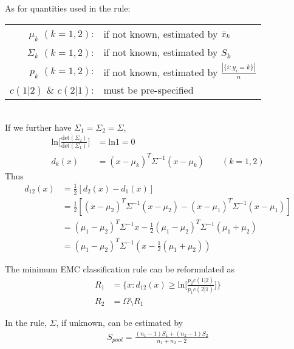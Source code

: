 \documentclass[12pt]{extarticle}
\newcommand{\<}{\langle}
\renewcommand{\>}{\rangle}
\theoremstyle{definition}
\begin{document}
As for quantities used in the rule:\\
\begin{tabular}{rl}
$\mu_k$ $(k=1,2)$:& if not known, estimated by $\Bar{x}_k$\\
$\Sigma_k$ $(k=1,2)$:& if not known, estimated by $S_k$\\
$p_k$ $(k=1,2)$:& if not known, estimated by $\frac{|\{i:y_i =k\}|}{n}$\\
$c(1|2)$ \& $c(2|1)$:& must be pre-specified
\end{tabular}\\

\newpage
If we further have $\Sigma_1 =\Sigma_2 =\Sigma$,
\begin{align*}
    \text{ln}\bigg[\frac{\text{det}(\Sigma_2)}{\text{det}(\Sigma_1)}\bigg] &= \text{ln}1 = 0\\
    d_k(x) &= (x-\mu_k)^T \Sigma^{-1} (x-\mu_k) \qquad (k=1,2)
\end{align*}
Thus
\begin{align*}
    d_{12}(x) &= \frac{1}{2}[d_2(x) -d_1(x)]\\
    &= \frac{1}{2}[(x-\mu_2)^T \Sigma^{-1} (x-\mu_2) -(x-\mu_1)^T \Sigma^{-1} (x-\mu_1)]\\
    &= (\mu_1 -\mu_2)^T \Sigma^{-1} x -\frac{1}{2} (\mu_1 -\mu_2)^T \Sigma^{-1} (\mu_1 +\mu_2) \\
    &= (\mu_1 -\mu_2)^T \Sigma^{-1} ( x - \frac{1}{2} (\mu_1 +\mu_2))
\end{align*}

\begin{tcolorbox}[enhanced, drop fuzzy shadow, title=Minimum ECM when K is 2; MVN with same covariance matrix]
The minimum EMC classification rule can be reformulated as
\begin{align*}
    R_1 &= \Bigg\{x:d_{12}(x) \geq \text{ln}\bigg[\frac{p_2 c(1|2)}{p_1 c(2|1)}\bigg] \Bigg\} \\
    R_2 &= \Omega \setminus R_1
\end{align*}
\end{tcolorbox}

In the rule, $\Sigma$, if unknown, can be estimated by
\begin{align*}
    S_{pool} =\frac{(n_1 -1)S_1 +(n_2 -1)S_2}{n_1 +n_2 -2}
\end{align*}
\end{document}

